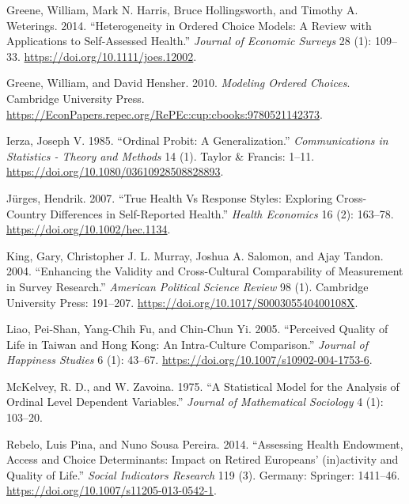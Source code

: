 \documentclass[]{article}
\begin{document}
\leavevmode\hypertarget{ref-Green2014}{}%
Greene, William, Mark N. Harris, Bruce Hollingsworth, and Timothy A.
Weterings. 2014. ``Heterogeneity in Ordered Choice Models: A Review with
Applications to Self-Assessed Health.'' \emph{Journal of Economic
Surveys} 28 (1): 109--33. \url{https://doi.org/10.1111/joes.12002}.

\leavevmode\hypertarget{ref-GreeneHensher2010}{}%
Greene, William, and David Hensher. 2010. \emph{Modeling Ordered
Choices}. Cambridge University Press.
\url{https://EconPapers.repec.org/RePEc:cup:cbooks:9780521142373}.

\leavevmode\hypertarget{ref-Terza1985}{}%
Ierza, Joseph V. 1985. ``Ordinal Probit: A Generalization.''
\emph{Communications in Statistics - Theory and Methods} 14 (1). Taylor
\& Francis: 1--11. \url{https://doi.org/10.1080/03610928508828893}.

\leavevmode\hypertarget{ref-Jurges2007}{}%
Jürges, Hendrik. 2007. ``True Health Vs Response Styles: Exploring
Cross-Country Differences in Self-Reported Health.'' \emph{Health
Economics} 16 (2): 163--78. \url{https://doi.org/10.1002/hec.1134}.

\leavevmode\hypertarget{ref-King2004}{}%
King, Gary, Christopher J. L. Murray, Joshua A. Salomon, and Ajay
Tandon. 2004. ``Enhancing the Validity and Cross-Cultural Comparability
of Measurement in Survey Research.'' \emph{American Political Science
Review} 98 (1). Cambridge University Press: 191--207.
\url{https://doi.org/10.1017/S000305540400108X}.

\leavevmode\hypertarget{ref-Liao2005}{}%
Liao, Pei-Shan, Yang-Chih Fu, and Chin-Chun Yi. 2005. ``Perceived
Quality of Life in Taiwan and Hong Kong: An Intra-Culture Comparison.''
\emph{Journal of Happiness Studies} 6 (1): 43--67.
\url{https://doi.org/10.1007/s10902-004-1753-6}.

\leavevmode\hypertarget{ref-McKelvey1975}{}%
McKelvey, R. D., and W. Zavoina. 1975. ``A Statistical Model for the
Analysis of Ordinal Level Dependent Variables.'' \emph{Journal of
Mathematical Sociology} 4 (1): 103--20.

\leavevmode\hypertarget{ref-Rebelo2014}{}%
Rebelo, Luis Pina, and Nuno Sousa Pereira. 2014. ``Assessing Health
Endowment, Access and Choice Determinants: Impact on Retired Europeans'
(in)activity and Quality of Life.'' \emph{Social Indicators Research}
119 (3). Germany: Springer: 1411--46.
\url{https://doi.org/10.1007/s11205-013-0542-1}.
\end{document}

